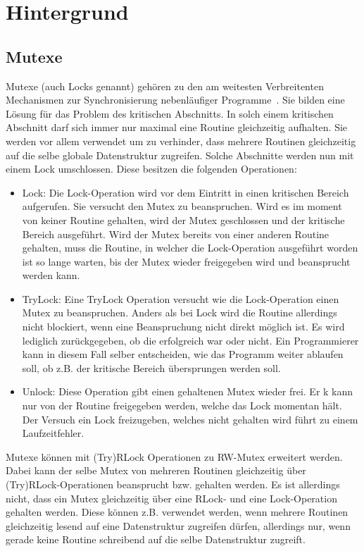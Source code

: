 \chapter{Hintergrund}\label{chap:background}

\section{Mutexe}\label{Chap:Back-Sec:Mutex}
Mutexe (auch Locks genannt) gehören zu den am weitesten Verbreitenten Mechanismen 
zur Synchronisierung nebenläufiger Programme~\cite{Undead}. Sie bilden 
eine Lösung für das Problem des kritischen Abschnitts. In solch einem 
kritischen Abschnitt darf sich immer nur maximal eine Routine gleichzeitig
aufhalten. Sie werden vor allem verwendet um zu verhinder, dass 
mehrere Routinen gleichzeitig auf die selbe globale Datenstruktur 
zugreifen. Solche Abschnitte werden nun mit einem Lock umschlossen. 
Diese besitzen die folgenden Operationen:
\begin{itemize}
  \item Lock: Die Lock-Operation wird vor dem Eintritt in einen kritischen 
    Bereich aufgerufen. Sie versucht den Mutex zu beanspruchen. Wird es im moment
    von keiner Routine gehalten, wird der Mutex geschlossen und der kritische
    Bereich ausgeführt. Wird der Mutex bereits von einer anderen Routine 
    gehalten, muss die Routine, in welcher die Lock-Operation ausgeführt 
    worden ist so lange warten, bis der Mutex wieder freigegeben wird und 
    beansprucht werden kann.
  \item TryLock: Eine TryLock Operation versucht wie die Lock-Operation 
    einen Mutex zu beanspruchen. Anders als bei Lock wird die Routine allerdings 
    nicht blockiert, wenn eine Beanspruchung nicht direkt möglich ist. Es wird 
    lediglich zurückgegeben, ob die erfolgreich war oder nicht. Ein Programmierer 
    kann in diesem Fall selber entscheiden, wie das Programm weiter ablaufen 
    soll, ob z.B. der kritische Bereich übersprungen werden soll.
  \item Unlock: Diese Operation gibt einen gehaltenen Mutex wieder frei. Er k
    kann nur von der Routine freigegeben werden, welche das Lock momentan
    hält. Der Versuch ein Lock freizugeben, welches nicht gehalten wird führt 
    zu einem Laufzeitfehler. 
\end{itemize}
Mutexe können mit (Try)RLock Operationen zu RW-Mutex erweitert werden.
Dabei kann der selbe Mutex von mehreren Routinen gleichzeitig über 
(Try)RLock-Operationen beansprucht bzw. gehalten werden. Es ist allerdings 
nicht, dass ein Mutex gleichzeitig über eine RLock- und eine Lock-Operation 
gehalten werden. Diese können z.B. verwendet werden, wenn mehrere Routinen 
gleichzeitig lesend auf eine Datenstruktur zugreifen dürfen, allerdings nur, 
wenn gerade keine Routine schreibend auf die selbe Datenstruktur zugreift.


